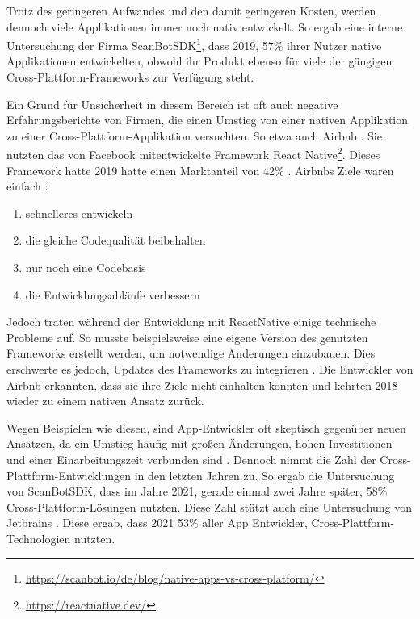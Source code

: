 Trotz des geringeren Aufwandes und den damit geringeren Kosten, werden dennoch viele Applikationen immer noch nativ entwickelt. So ergab eine interne Untersuchung der Firma ScanBotSDK\footnote{\label{scanbot_footnote}\url{https://scanbot.io/de/blog/native-apps-vs-cross-platform/}}, dass 2019, 57\% ihrer Nutzer native Applikationen entwickelten, obwohl ihr Produkt ebenso für viele der gängigen Cross-Plattform-Frameworks zur Verfügung steht.

Ein Grund für Unsicherheit in diesem Bereich ist oft auch negative Erfahrungsberichte von Firmen, die einen Umstieg von einer nativen Applikation zu einer Cross-Plattform-Applikation versuchten. So etwa auch Airbnb \cite{Airbnb_react_goals}. Sie nutzten das von Facebook mitentwickelte Framework React Native\footnote{\url{https://reactnative.dev/}}. Dieses Framework hatte 2019 hatte einen Marktanteil von 42\% \cite{statist_CP_Framework}. 
\break
Airbnbs Ziele waren einfach \cite{statist_CP_Framework}:
\begin{enumerate}%
    \item schnelleres entwickeln
    \item die gleiche Codequalität beibehalten
    \item nur noch eine Codebasis
    \item die Entwicklungsabläufe verbessern
\end{enumerate}
\nointerlineskip
Jedoch traten während der Entwicklung mit ReactNative einige technische Probleme auf. So musste beispielsweise eine eigene Version des genutzten Frameworks erstellt werden, um notwendige Änderungen einzubauen. Dies erschwerte es jedoch, Updates des Frameworks zu integrieren \cite{Airbnb_technology}. Die Entwickler von Airbnb erkannten, dass sie ihre Ziele nicht einhalten konnten und kehrten 2018 wieder zu einem nativen Ansatz zurück.

Wegen Beispielen wie diesen, sind App-Entwickler oft skeptisch gegenüber neuen Ansätzen, da ein Umstieg häufig mit großen Änderungen, hohen Investitionen und einer Einarbeitungszeit verbunden sind \cite{medium_Lehtimäki}. Dennoch nimmt die Zahl der Cross-Plattform-Entwicklungen in den letzten Jahren zu. 
So ergab die Untersuchung von ScanBotSDK, dass im Jahre 2021, gerade einmal zwei Jahre später, 58\% Cross-Plattform-Lösungen nutzten. Diese Zahl stützt auch eine Untersuchung von Jetbrains \cite{JetBrains_miscellaneous_2021}. Diese ergab, dass 2021 53\% aller App Entwickler, Cross-Plattform-Technologien nutzten.

